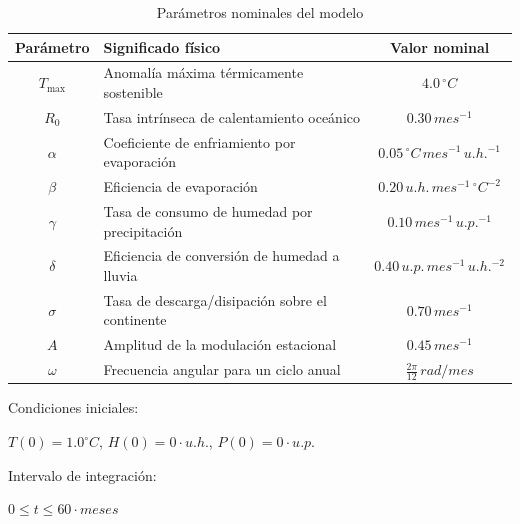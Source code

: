 \begin{table}[h]
    \centering
    \begin{tabular}{|c|l|c|}
        \hline
        Parámetro & Significado físico & Valor nominal \\
        \hline
        $T_{\max}$ & Anomalía máxima térmicamente sostenible & $4.0 \, ^\circ C$ \\
        \hline
        $R_0$ & Tasa intrínseca de calentamiento oceánico & $0.30 \, mes^{-1}$ \\
        \hline
        $\alpha$ & Coeficiente de enfriamiento por evaporación & $0.05 \, ^\circ C \, mes^{-1} \, u.h.^{-1}$ \\
        \hline
        $\beta$ & Eficiencia de evaporación & $0.20 \, u.h. \, mes^{-1} \, ^\circ C^{-2}$ \\
        \hline
        $\gamma$ & Tasa de consumo de humedad por precipitación & $0.10 \, mes^{-1} \, u.p.^{-1}$ \\
        \hline
        $\delta$ & Eficiencia de conversión de humedad a lluvia & $0.40 \, u.p. \, mes^{-1} \, u.h.^{-2}$ \\
        \hline
        $\sigma$ & Tasa de descarga/disipación sobre el continente & $0.70 \, mes^{-1}$ \\
        \hline
        $A$ & Amplitud de la modulación estacional & $0.45 \, mes^{-1}$ \\
        \hline
        $\omega$ & Frecuencia angular para un ciclo anual & $\frac{2\pi}{12} \, rad/mes$ \\
        \hline
    \end{tabular}
    \caption{Parámetros nominales del modelo}
    \label{tab:parametros}
\end{table}

Condiciones iniciales:

$T(0) = 1.0 ^\circ C$,     
$H(0) = 0 \cdot u.h.$,     
$P(0) = 0 \cdot u.p.$ 

Intervalo de integración: 

$0 \leq t \leq 60 \cdot meses$ 
